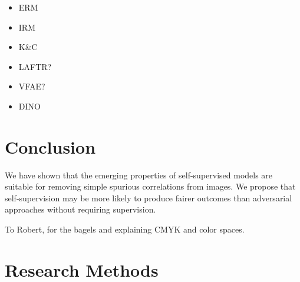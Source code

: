 \documentclass[sigconf,anonymous,review]{acmart}
\begin{document}
\begin{itemize}
    \item ERM
    \item IRM
    \item K\&C
    \item LAFTR?
    \item VFAE?
    \item DINO
\end{itemize}


\section{Conclusion}
\label{sec:conclusion}

We have shown that the emerging properties of self-supervised models are suitable for removing simple spurious correlations from images.
We propose that self-supervision may be more likely to produce fairer outcomes than adversarial approaches without requiring supervision.

\begin{acks}
To Robert, for the bagels and explaining CMYK and color spaces.
\end{acks}




\appendix
\section{Research Methods}
\end{document}
